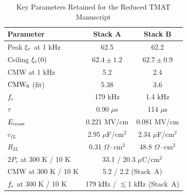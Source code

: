 \begin{table}[!b]
\renewcommand{\arraystretch}{1.05}
\caption{Key Parameters Retained for the Reduced TMAT Manuscript}
\label{tab:summary}
\centering
\scriptsize
\setlength{\tabcolsep}{3pt}
\begin{tabular}{@{}lcc@{}}
\toprule
Parameter & Stack A & Stack B \\
\midrule
Peak $\xi_{r}$ at 1 kHz & 62.5 & 62.2 \\
Ceiling $\xi_{r}(0)$ & $62.4\pm1.2$ & $62.7\pm0.9$ \\
CMW at 1 kHz & 5.2 & 2.4 \\
$\mathrm{CMW}_0$ (fit) & 5.38 & 3.6 \\
$f_{c}$ & 179 kHz & 1.4 kHz \\
$\tau$ & 0.90 $\mu$s & 114 $\mu$s \\
$E_{\mathrm{cross}}$ & 0.221 MV/cm & 0.081 MV/cm \\
$c_{IL}$ & 2.95 $\mu$F/cm$^2$ & 2.34 $\mu$F/cm$^2$ \\
$R_{IL}$ & 0.31 $\Omega\cdot$cm$^2$ & 48.8 $\Omega\cdot$cm$^2$ \\
\midrule
$2P_r$ at 300 K / 10 K & \multicolumn{2}{c}{33.1 / 20.3 $\mu$C/cm$^2$} \\
CMW at 300 K / 10 K & \multicolumn{2}{c}{5.2 / 2.2 (Stack~A)} \\
$f_{c}$ at 300 K / 10 K & \multicolumn{2}{c}{179 kHz / $\lesssim$1 kHz (Stack~A)} \\
\bottomrule
\end{tabular}
\end{table}
